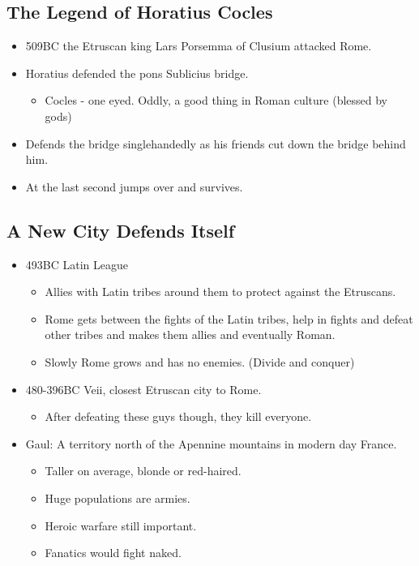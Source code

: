 \documentclass[12pt, twoside]{article}
\begin{document}
\subsection{The Legend of Horatius Cocles}
\begin{itemize}
\item 509BC the Etruscan king Lars Porsemma of Clusium attacked Rome.
\item Horatius defended the pons Sublicius bridge.
	\begin{itemize}
	\item Cocles - one eyed.  Oddly, a good thing in Roman culture (blessed by gods)
	\end{itemize}
\item Defends the bridge singlehandedly as his friends cut down the bridge behind him.
\item At the last second jumps over and survives.
\end{itemize}
\subsection{A New City Defends Itself}
\begin{itemize}
\item 493BC Latin League
	\begin{itemize}
	\item Allies with Latin tribes around them to protect against the Etruscans.
	\item Rome gets between the fights of the Latin tribes, help in fights and defeat other tribes and makes them allies and eventually Roman.
	\item Slowly Rome grows and has no enemies. (Divide and conquer)
	\end{itemize}
\item 480-396BC Veii, closest Etruscan city to Rome.
	\begin{itemize}
	\item After defeating these guys though, they kill everyone.
	\end{itemize}
\item Gaul: A territory north of the Apennine mountains in modern day France.
	\begin{itemize}
	\item Taller on average, blonde or red-haired.
	\item Huge populations are armies.
	\item Heroic warfare still important.
	\item Fanatics would fight naked.
	\end{itemize}
\end{itemize}
\end{document}
